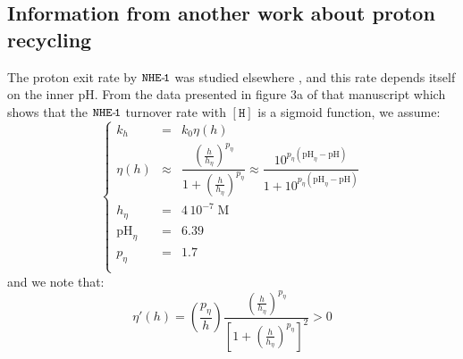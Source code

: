 \documentclass[aps,onecolumn,12pt]{revtex4}
\newcommand{\mychem}[1]{\mathtt{#1}}
\newcommand{\myconc}[1]{\left\lbrack{#1}\right\rbrack}
\newcommand{\spproton}{\mychem{H}}
\newcommand{\proton}{\myconc{\spproton}}
\newcommand{\NHE}[1]{\mychem{NHE}{\mychem{\hbox{-}\!#1}}}
\newcommand{\todo}[1]{\framebox{\textbf{\color{WildStrawberry}{#1}}}}
\begin{document}
\subsection{Information from another work about proton recycling}
The proton exit rate by $\NHE{1}$ was studied elsewhere \todo{ref EMBO Lacroix,Counillon}, and this rate depends itself on the inner pH.
From the data presented in figure 3a of that manuscript which shows that the $\NHE{1}$ turnover rate with $\proton$ is a sigmoid function, we
assume:
\begin{equation}
\label{eq:kh}
\left\lbrace
\begin{array}{rcl}
k_h & = & k_0 \eta(h)\\
\eta(h) & \approx & \dfrac{\left(\frac{h}{h_\eta}\right)^{p_\eta}}{1+\left(\frac{h}{h_\eta}\right)^{p_\eta}} \approx 
        \dfrac
{
10^{p_\eta(\mathrm{pH}_\eta-\mathrm{pH})}
}
{
1+10^{p_\eta(\mathrm{pH}_\eta-\mathrm{pH})}
}\\
h_\eta & = & 4\,10^{-7} \; \text{M}\\
\mathrm{pH}_\eta & = & 6.39 \\
p_\eta & = & 1.7 \\
\end{array}
\right.
\end{equation}
and we note that:
\begin{equation}
	\eta'(h) = \left(\dfrac{p_\eta}{h}\right) \dfrac{\left(\frac{h}{h_\eta}\right)^{p_\eta}}{\left[1+\left(\frac{h}{h_\eta}\right)^{p_\eta}\right]^2}  > 0
\end{equation}
\end{document}
